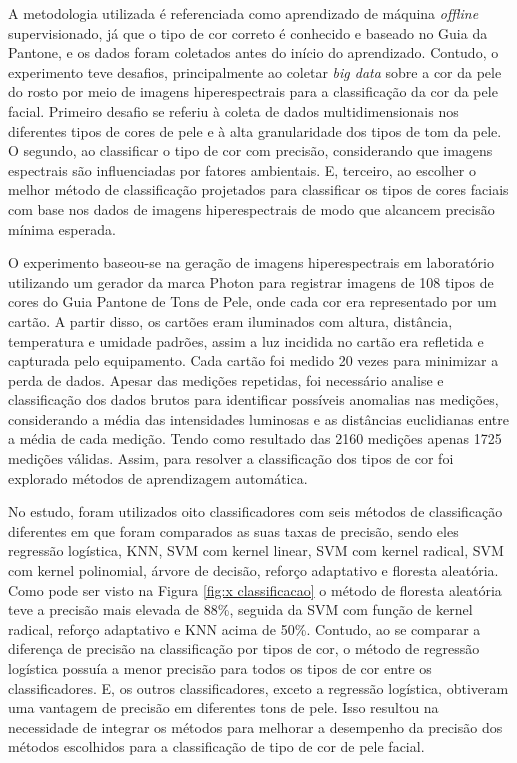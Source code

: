 A metodologia utilizada é referenciada como aprendizado de máquina \textit{offline} supervisionado, já que o tipo de cor correto é conhecido e baseado no Guia da Pantone, e os dados foram coletados antes do início do aprendizado. Contudo, o experimento teve desafios, principalmente ao  coletar \textit{big data} sobre a cor da pele do rosto por meio de imagens hiperespectrais para a classificação da cor da pele facial.  Primeiro desafio se referiu à coleta de dados multidimensionais nos diferentes tipos de cores de pele e à alta granularidade dos tipos de tom da pele. O segundo, ao classificar o tipo de cor com precisão, considerando que imagens espectrais são influenciadas por fatores ambientais. E, terceiro, ao escolher o melhor método de classificação projetados para classificar os tipos de cores faciais com base nos dados de imagens hiperespectrais de modo que alcancem precisão mínima esperada.

O experimento baseou-se na geração de imagens hiperespectrais em laboratório utilizando um gerador da marca Photon para registrar imagens de 108 tipos de cores do Guia Pantone de Tons de Pele, onde cada cor era representado por um cartão. A partir disso, os cartões eram iluminados com altura, distância, temperatura e umidade padrões, assim a luz incidida no cartão era refletida e capturada pelo equipamento. Cada cartão foi medido 20 vezes para minimizar a perda de dados. Apesar das medições repetidas, foi necessário analise e classificação  dos dados brutos para identificar possíveis anomalias nas medições, considerando a média das intensidades luminosas e as distâncias euclidianas entre a média de cada medição. Tendo como resultado das 2160 medições apenas 1725 medições válidas. Assim, para resolver a classificação dos tipos de cor foi explorado métodos de aprendizagem automática.

No estudo, foram utilizados oito classificadores com seis métodos de classificação diferentes em que foram comparados as suas taxas de precisão, sendo eles regressão logística, KNN, SVM com kernel linear, SVM com kernel radical, SVM com kernel polinomial, árvore de decisão, reforço adaptativo e floresta aleatória. Como pode ser visto na Figura \ref{fig:x classificacao} o método de floresta aleatória teve a precisão mais elevada de 88\%, seguida da SVM com função de kernel radical, reforço adaptativo e KNN acima de 50\%. Contudo, ao se comparar a diferença de precisão na classificação por tipos de cor, o método de regressão logística possuía a menor precisão para todos os tipos de cor entre os classificadores. E, os outros classificadores, exceto a regressão logística, obtiveram uma vantagem de precisão em diferentes tons de pele. Isso resultou na necessidade de integrar os métodos para melhorar a desempenho da precisão dos métodos escolhidos para a classificação de tipo de cor de pele facial.

